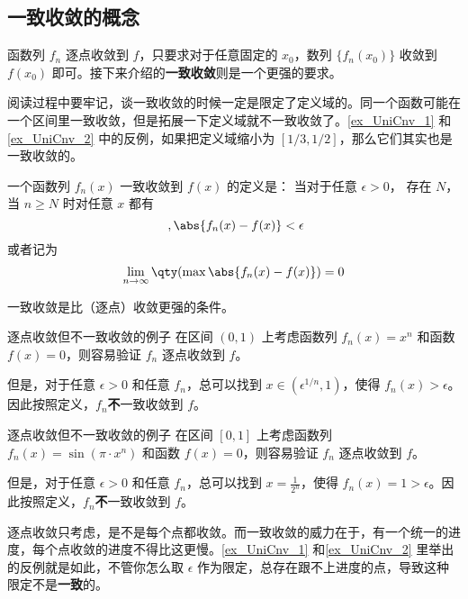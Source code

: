 



\subsection{一致收敛的概念}

函数列 $f_n$ 逐点收敛到 $f$，只要求对于任意固定的 $x_0$，数列 $\{f_n(x_0)\}$ 收敛到 $f(x_0)$ 即可。接下来介绍的\textbf{一致收敛}则是一个更强的要求。

阅读过程中要牢记，谈一致收敛的时候一定是限定了定义域的。同一个函数可能在一个区间里一致收敛，但是拓展一下定义域就不一致收敛了。\autoref{ex_UniCnv_1} 和\autoref{ex_UniCnv_2} 中的反例，如果把定义域缩小为 $[1/3, 1/2]$，那么它们其实也是一致收敛的。

一个函数列 $f_n(x)$ 一致收敛到 $f(x)$ 的定义是： 当对于任意 $\epsilon > 0$， 存在 $N$， 当 $n \geqslant N$ 时对任意 $x$ 都有
\begin{equation}\label{eq_UniCnv_1}~,
\abs{f_n(x) - f(x)} < \epsilon
\end{equation}
或者记为
\begin{equation}
\lim_{n\to\infty} \qty(\max \abs{f_n(x) - f(x)}) = 0
\end{equation}

一致收敛是比（逐点）收敛更强的条件。

\begin{example}{逐点收敛但不一致收敛的例子}\label{ex_UniCnv_1}
在区间 $(0, 1)$ 上考虑函数列 $f_n(x)=x^n$ 和函数 $f(x)=0$，则容易验证 $f_n$ 逐点收敛到 $f$。

但是，对于任意 $\epsilon>0$ 和任意 $f_n$，总可以找到 $x\in(\epsilon^{1/n}, 1)$，使得 $f_n(x)>\epsilon$。因此按照定义，$f_n$\textbf{不}一致收敛到 $f$。

\end{example}

\begin{example}{逐点收敛但不一致收敛的例子}\label{ex_UniCnv_2}
在区间 $[0, 1]$ 上考虑函数列 $f_n(x)=\sin(\pi\cdot x^n)$ 和函数 $f(x)=0$，则容易验证 $f_n$ 逐点收敛到 $f$。

但是，对于任意 $\epsilon>0$ 和任意 $f_n$，总可以找到 $x=\frac{1}{2^n}$，使得 $f_n(x)=1>\epsilon$。因此按照定义，$f_n$\textbf{不}一致收敛到 $f$。

\end{example}

逐点收敛只考虑，是不是每个点都收敛。而一致收敛的威力在于，有一个统一的进度，每个点收敛的进度不得比这更慢。\autoref{ex_UniCnv_1} 和\autoref{ex_UniCnv_2} 里举出的反例就是如此，不管你怎么取 $\epsilon$ 作为限定，总存在跟不上进度的点，导致这种限定不是\textbf{一致}的。

